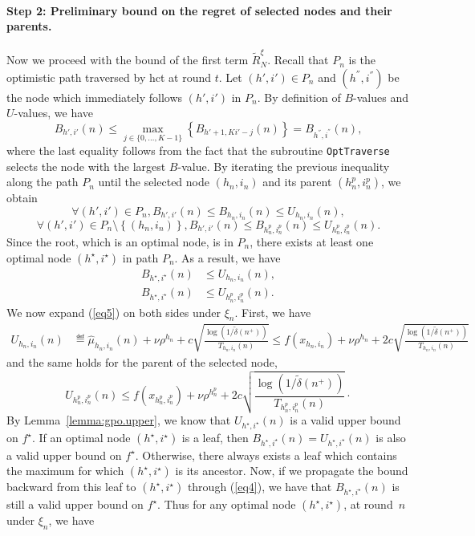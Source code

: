 \paragraph{Step 2: Preliminary bound on the regret of selected nodes and their parents.}
Now we proceed with the bound of the first term $\tilde{R}_N^{\xi}$.
Recall that $P_n$ is the optimistic path traversed by \gls{hct} at round $t$.
Let $(h',i')\in P_n$ and $(h^{''},i^{''})$ be the node which immediately follows $(h',i')$ in $P_n$. By definition of $B$-values and $U$-values, we have
\begin{equation} \label{eq4}
B_{h',i'}(n) \leq \underset{j\in\{0,\ldots,K-1\}}{\max} \left\{B_{h'+1,Ki'-j}(n)\right\} = B_{h^{''},i^{''}}(n),
\end{equation}
where the last equality follows from the fact that the subroutine \texttt{OptTraverse} selects the node with the largest $B$-value. By iterating the previous inequality along  the path $P_n$ until the selected node $(h_n,i_n)$ and its parent $(h_n^p,i_n^p)$, we obtain
\[
\forall (h',i')\in P_n, B_{h',i'}(n) \leq B_{h_n,i_n}(n) \leq U_{h_n,i_n}(n),
\]
\[
\forall (h',i')\in P_n\setminus \left\{(h_n,i_n)\right\}, B_{h',i'}(n) \leq B_{h_n^p,i_n^p}(n) \leq U_{h_n^p,i_n^p}(n).
\]
Since the root, which is an optimal node, is in $P_n$, there exists at least one optimal node $(h^\star,i^\star)$ in path $P_n$. As a result, we have
\begin{align}
    B_{h^\star,i^\star}(n) & \leq U_{h_n,i_n}(n), \label{eq5} \\
    B_{h^\star,i^\star}(n) & \leq U_{h_n^p,i_n^p}(n). \label{eq6}
\end{align}
We now expand (\ref{eq5}) on both sides under $\xi_n$. First, we have
\begin{align}
    U_{h_n,i_n}(n) & \eqdef \hat{\mu}_{h_n,i_n}(n) + \nu\rho^{h_n} +     c\sqrt{\frac{\log(1/\tilde{\delta}(n^+))}{T_{h_n,i_n}(n)}} %
                   \leq f(x_{h_n,i_n}) + \nu\rho^{h_n} + 2c\sqrt{\frac{\log(1/\tilde{\delta}(n^+))}{T_{h_n,i_n}(n)}} \label{eq8}
\end{align}
and the same holds for the parent of the selected node,
\begin{equation*} %
U_{h_n^p,i_n^p}(n) \leq f(x_{h_n^p,i_n^p}) +\nu\rho^{h_n^p} + 2c\sqrt{\frac{\log(1/\tilde{\delta}(n^+))}{T_{h_n^p,i_n^p}(n)}}\cdot
\end{equation*}
By Lemma~\ref{lemma:gpo.upper}, we know that $U_{h^\star,i^\star}(n)$ is a valid upper bound on $f^\star$. If an optimal node $(h^\star,i^\star)$ is a leaf, then $B_{h^\star,i^\star}(n)=U_{h^\star,i^\star}(n)$ is also a valid upper bound on $f^\star$. Otherwise, there always exists a leaf which contains the maximum for which $(h^\star,i^\star)$ is its ancestor. Now, if we propagate the bound backward from this leaf to $(h^\star,i^\star)$ through (\ref{eq4}), we have that $B_{h^\star,i^\star}(n)$ is still a valid upper bound on $f^\star$. Thus for any optimal node $(h^\star,i^\star)$, at round~$n$ under $\xi_n$, we have
